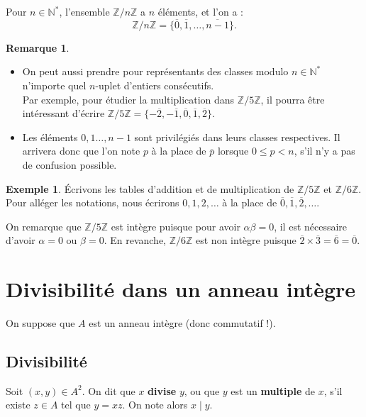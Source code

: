\documentclass[french]{article}
\newcommand{\N}{\mathbb{N}}
\newcommand{\Z}{\mathbb{Z}}
\newcommand{\st}{^*}
\theoremstyle{plain}
\theoremstyle{definition}
\newtheorem*{ex}{Exemple}
\newtheorem*{rmq}{Remarque}
\theoremstyle{remark}
\begin{document}
\begin{prop}%
	Pour $n\in\N\st$, l'ensemble $\Z/n\Z$ a $n$ éléments, et l'on a :
	$$\Z/n\Z=\{\overline{0},\overline{1},\ldots,\overline{n-1}\}.$$
\end{prop}

\begin{rmq}
	\begin{itemize}
		\item On peut aussi prendre pour représentants des classes modulo $n\in\N\st$ n'importe quel $n$-uplet d'entiers consécutifs. \\
		Par exemple, pour étudier la multiplication dans $\Z/5\Z$, il pourra être intéressant d'écrire $\Z/5\Z=\{-\overline{2},-\overline{1},\overline{0},\overline{1},\overline{2}\}$.
		\item Les éléments $0,1\ldots,n-1$ sont privilégiés dans leurs classes respectives. Il arrivera donc que l'on note $p$ à la place de $\overline{p}$ lorsque $0\leqslant p<n$, s'il n'y a pas de confusion possible.
	\end{itemize}
\end{rmq}

\begin{ex}
	Écrivons les tables d'addition et de multiplication de $\Z/5\Z$ et $\Z/6\Z$. Pour alléger les notations, nous écrirons $0,1,2,\ldots$ à la place de $\overline{0},\overline{1},\overline{2},\ldots$.
	
	On remarque que $\Z/5\Z$ est intègre puisque pour avoir $\alpha\beta=0$, il est nécessaire d'avoir $\alpha=0$ ou $\beta=0$. En revanche, $\Z/6\Z$ est non intègre puisque $\overline{2}\times\overline{3}=\overline{6}=\overline{0}$.
\end{ex}

\section{Divisibilité dans un anneau intègre}

On suppose que $A$ est un anneau intègre (donc commutatif !).

\subsection{Divisibilité}

\begin{dfn}
	Soit $(x,y)\in A^2$. On dit que $x$ \textbf{divise} $y$, ou que $y$ est un \textbf{multiple} de $x$, s'il existe $z\in A$ tel que $y=xz$. On note alors $x\mid y$.
\end{dfn}
\end{document}
